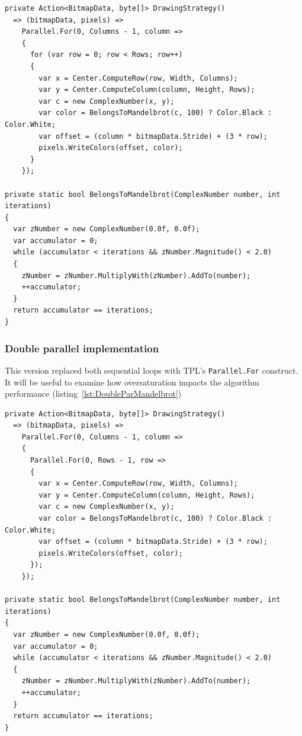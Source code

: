 \begin{lstlisting}[style=sharpcstyle, caption={Parallel Mandelbrot algorithm}, label={lst:ParMandelbrot},
numbers=none, xleftmargin=0pt,framexleftmargin=0pt,framexrightmargin=0pt,framexbottommargin=0pt]
private Action<BitmapData, byte[]> DrawingStrategy()
  => (bitmapData, pixels) =>
    Parallel.For(0, Columns - 1, column =>
    {
      for (var row = 0; row < Rows; row++)
      {
        var x = Center.ComputeRow(row, Width, Columns);
        var y = Center.ComputeColumn(column, Height, Rows);
        var c = new ComplexNumber(x, y);
        var color = BelongsToMandelbrot(c, 100) ? Color.Black : Color.White;
        var offset = (column * bitmapData.Stride) + (3 * row);
        pixels.WriteColors(offset, color);
      }
    });

private static bool BelongsToMandelbrot(ComplexNumber number, int iterations)
{
  var zNumber = new ComplexNumber(0.0f, 0.0f);
  var accumulator = 0;
  while (accumulator < iterations && zNumber.Magnitude() < 2.0)
  {
    zNumber = zNumber.MultiplyWith(zNumber).AddTo(number);
    ++accumulator;
  }
  return accumulator == iterations;
}
\end{lstlisting}

\subsubsection{Double parallel implementation}
This version replaced both sequential loops with TPL's \texttt{Parallel.For} construct. It will be useful to examine how oversaturation impacts the algorithm performance (listing~\ref{lst:DoubleParMandelbrot})

\begin{lstlisting}[style=sharpcstyle, caption={Double parallel Mandelbrot algorithm}, label={lst:DoubleParMandelbrot},
numbers=none, xleftmargin=0pt,framexleftmargin=0pt,framexrightmargin=0pt,framexbottommargin=0pt]
private Action<BitmapData, byte[]> DrawingStrategy()
  => (bitmapData, pixels) =>
    Parallel.For(0, Columns - 1, column =>
    {
      Parallel.For(0, Rows - 1, row =>
      {
        var x = Center.ComputeRow(row, Width, Columns);
        var y = Center.ComputeColumn(column, Height, Rows);
        var c = new ComplexNumber(x, y);
        var color = BelongsToMandelbrot(c, 100) ? Color.Black : Color.White;
        var offset = (column * bitmapData.Stride) + (3 * row);
        pixels.WriteColors(offset, color);
      });
    });

private static bool BelongsToMandelbrot(ComplexNumber number, int iterations)
{
  var zNumber = new ComplexNumber(0.0f, 0.0f);
  var accumulator = 0;
  while (accumulator < iterations && zNumber.Magnitude() < 2.0)
  {
    zNumber = zNumber.MultiplyWith(zNumber).AddTo(number);
    ++accumulator;
  }
  return accumulator == iterations;
}
\end{lstlisting}

